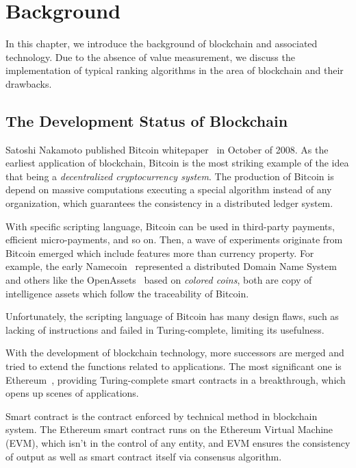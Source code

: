 
\section{Background}
In this chapter, we introduce the background of blockchain and associated technology. Due to the absence of value measurement, we discuss the implementation of typical ranking algorithms in the area of blockchain and their drawbacks.

\subsection{The Development Status of Blockchain}

Satoshi Nakamoto published Bitcoin whitepaper~\cite{Nakamoto2008} in October of 2008. As the earliest application of blockchain, Bitcoin is the most striking example of the idea that being a \emph{decentralized cryptocurrency system}. The production of Bitcoin is depend on massive computations executing a special algorithm instead of any organization, which guarantees the consistency in a distributed ledger system.

With specific scripting language, Bitcoin can be used in third-party payments, efficient micro-payments, and so on. Then, a wave of experiments originate from Bitcoin emerged which include features more than currency property. For example, the early Namecoin~\cite{Namecoin} represented a distributed Domain Name System and others like the OpenAssets~\cite{OpenAssets} based on \emph{colored coins}, both are copy of intelligence assets which follow the traceability of Bitcoin.

Unfortunately, the scripting language of Bitcoin has many design flaws, such as lacking of instructions and failed in Turing-complete, limiting its usefulness.

With the development of blockchain technology, more successors are merged and tried to extend the functions related to applications. The most significant one is Ethereum~\cite{buterin2013ethereum}, providing Turing-complete smart contracts in a breakthrough, which opens up scenes of applications.

Smart contract is the contract enforced by technical method in blockchain system. The Ethereum smart contract runs on the Ethereum Virtual Machine (EVM), which isn't in the control of any entity, and EVM ensures the consistency of output as well as smart contract itself via consensus algorithm.

